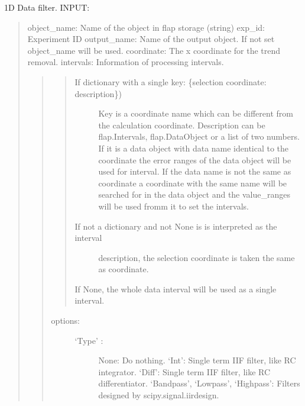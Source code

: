 \documentclass[letterpaper,10pt,english]{sphinxmanual}
\begin{document}

\begin{fulllineitems}
\label{\detokenize{data_object:flap.data_object.filter_data}}
1D Data filter.
INPUT:
\begin{quote}

object\_name: Name of the object in flap storage (string)
exp\_id: Experiment ID
output\_name: Name of the output object. If not set object\_name will be used.
coordinate: The x coordinate for the trend removal.
intervals: Information of processing intervals.
\begin{quote}
\begin{quote}
\begin{description}
\item[{If dictionary with a single key: \{selection coordinate: description\})}] \leavevmode
Key is a coordinate name which can be different from the calculation
coordinate.
Description can be flap.Intervals, flap.DataObject or
a list of two numbers. If it is a data object with data name identical to
the coordinate the error ranges of the data object will be used for
interval. If the data name is not the same as coordinate a coordinate with the
same name will be searched for in the data object and the value\_ranges
will be used fromm it to set the intervals.

\item[{If not a dictionary and not None is is interpreted as the interval}] \leavevmode
description, the selection coordinate is taken the same as
coordinate.

\end{description}

If None, the whole data interval will be used as a single interval.
\end{quote}
\begin{description}
\item[{options:}] \leavevmode\begin{description}
\item[{‘Type’ :}] \leavevmode
None: Do nothing.
‘Int’: Single term IIF filter, like RC integrator.
‘Diff’: Single term IIF filter, like RC differentiator.
‘Bandpass’, ‘Lowpass’, ‘Highpass’: Filters designed by scipy.signal.iirdesign.
\begin{quote}
\begin{quote}


\end{quote}
\end{quote}
\end{description}
\end{description}
\end{quote}
\end{quote}
\end{fulllineitems}
\end{document}
